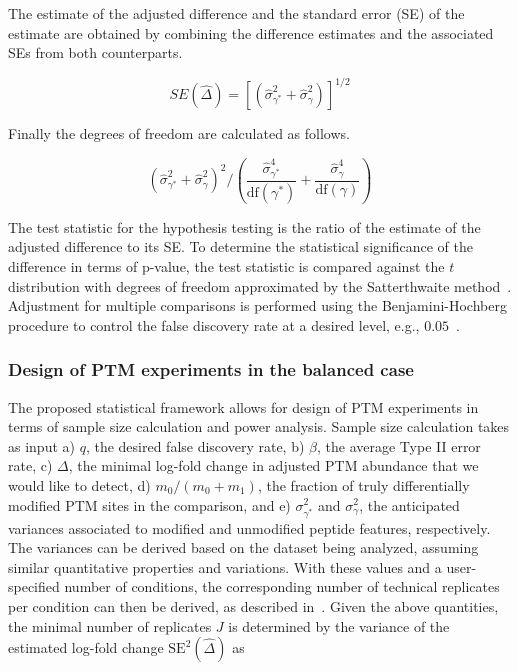 \documentclass[mcp]{article}
\numberwithin{table}{section}
\begin{document}
The estimate of the adjusted difference and the standard error (SE) of the estimate are obtained by combining the difference estimates and the associated SEs from both counterparts.

\begin{equation}
SE(\hat{\Delta}) = \left[ \left( \hat{\sigma}_{\gamma^{\ast}}^{2} + \hat{\sigma}_{\gamma}^{2} \right) \right]^{1/2}
\end{equation}

Finally the degrees of freedom are calculated as follows.

\begin{equation}
\left( \hat{\sigma}_{\gamma^{\ast}}^{2} + \hat{\sigma}_{\gamma}^{2} \right)^2 \bigg/
\left( \frac{\hat{\sigma}_{\gamma^{\ast}}^{4}}{\mathrm{df}(\gamma^{\ast})} + \frac{\hat{\sigma}_{\gamma}^{4}}{ \mathrm{df}(\gamma)} \right)
\end{equation}

The test statistic for the hypothesis testing is the ratio of the estimate of the adjusted difference to its SE. To determine the statistical significance of the difference in terms of p-value, the test statistic is compared against the $t$ distribution with degrees of freedom approximated by the Satterthwaite method~\cite{satterthwaite:1946}. Adjustment for multiple comparisons is performed using the Benjamini-Hochberg procedure to control the false discovery rate at a desired level, e.g., $0.05$~\cite{Benjamini:1995}.

\subsubsection*{Design of PTM experiments in the balanced case}
\label{sec:design}

The proposed statistical framework allows for design of PTM experiments in terms of sample size calculation and power analysis. 
Sample size calculation takes as input a) $q$, the desired false discovery rate, b) $\beta$, the average Type II error rate, c) $\Delta$, the minimal log-fold change in adjusted PTM abundance that we would like to detect, d) $m_0 / (m_0 + m_1)$, the fraction of truly differentially modified PTM sites in the comparison, and e) $\sigma_{\gamma^{\ast}}^{2}$ and $\sigma_{\gamma}^{2}$, the anticipated variances associated to modified and unmodified peptide features, respectively. The variances can be derived based on the dataset being analyzed, assuming similar quantitative properties and variations. With these values and a user-specified number of conditions, the corresponding number of technical replicates per condition can then be derived, as described in~\cite{kutner_etal_04a}. Given the above quantities, the minimal number of replicates $J$ is determined by the variance of the estimated log-fold change $\mathrm{SE}^{2}(\hat{\Delta})$ as
\end{document}

